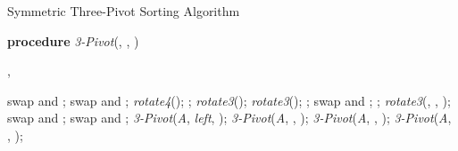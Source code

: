 \documentclass[prodmode,acmtalg]{acmsmall}
\begin{document}
\begin{algorithm}
    \caption{Symmetric Three-Pivot Sorting Algorithm}\samepage\label{algo:three:pivot}
    \textbf{procedure} \textit{3-Pivot}(, , )
    \begin{algorithmic}[1]
        \Require , 
            
        \State 
        \State 
        
        \While{}
            \While{}
                \If{}
                    \State swap  and ;
                    \State 
                \EndIf
                \State 
            \EndWhile
            \While{}
                \If{}
                    \State swap  and ;
                    \State 
                \EndIf
                \State 
            \EndWhile
            \If{}
                \If{}
                    \If{}
                        \State \textit{rotate4}();
                        \State ;
                    \Else
                        \State \textit{rotate3}();
                    \EndIf
                    \State 
                \Else
                    \If{}
                        \State \textit{rotate3}();
                        \State ;
                    \Else
                        \State swap  and 
                        ;
                    \EndIf
                \EndIf
                \State ;
            \EndIf
        \EndWhile
        \State \textit{rotate3}(, ,
                                );
        \State swap  and ;
        \State swap  and ;
        \State \textit{3-Pivot}(\textit{A}, \textit{left}, );
        \State \textit{3-Pivot}(\textit{A}, , );
        \State \textit{3-Pivot}(\textit{A}, , );
        \State \textit{3-Pivot}(\textit{A}, , );
    \end{algorithmic}
\end{algorithm}




\newpage
\end{document}
